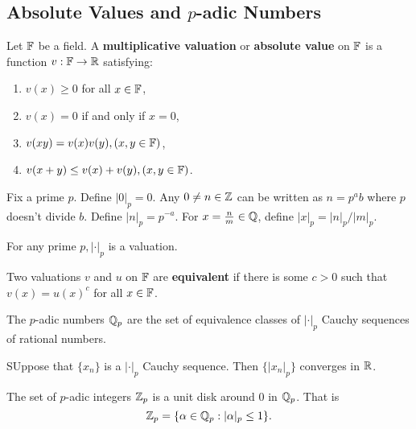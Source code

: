 \subsection{Absolute Values and \(p\)-adic Numbers}

\begin{definition}
    Let \(\mathbb{F}\) be a field. A \textbf{multiplicative valuation} or \textbf{absolute value} on \(\mathbb{F}\) is a function \(v : \mathbb{F} \to \mathbb{R}\) satisfying:
    \begin{enumerate}
        \item \(v(x) \geq 0\) for all \(x \in \mathbb{F}\),
        \item \(v(x) = 0\) if and only if \(x = 0\),
        \item \(v(xy) = v(x)v(y), (x, y \in \mathbb{F})\),
        \item \(v(x + y) \leq v(x) + v(y), (x, y \in \mathbb{F})\).
    \end{enumerate}
\end{definition}

\begin{definition}
    Fix a prime \(p\). Define \(|0|_p = 0\). Any \(0 \neq n \in \mathbb{Z}\) can be written as \(n = p^a b\) where \(p\) doesn't divide \(b\). Define \(|n|_p = p^{-a}\). For \(x = \frac{n}{m} \in \mathbb{Q}\), define \(|x|_p = |n|_p / |m|_p\).
\end{definition}

\begin{theorem}
    For any prime \(p, |\cdot|_p\) is a valuation.
\end{theorem}

\begin{definition}
    Two valuations \(v\) and \(u\) on \(\mathbb{F}\) are \textbf{equivalent} if there is some \(c > 0\) such that \(v(x) = u(x)^c\) for all \(x \in \mathbb{F}\).
\end{definition}

\begin{definition}
    The \(p\)-adic numbers \(\mathbb{Q}_p\) are the set of equivalence classes of \(|\cdot|_p\) Cauchy sequences of rational numbers.
\end{definition}

\begin{proposition}
    SUppose that \(\{x_n\}\) is a \(|\cdot|_p\) Cauchy sequence. Then \(\{|x_n|_p\}\) converges in \(\mathbb{R}\).
\end{proposition}

\begin{definition}
    The set of \(p\)-adic integers \(\mathbb{Z}_p\) is a unit disk around 0 in \(\mathbb{Q}_p\). That is
    \[\mathbb{Z}_p = \{\alpha \in \mathbb{Q}_p : |\alpha|_p \leq 1\}.\]
\end{definition}

